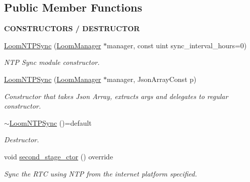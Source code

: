 \subsection*{Public Member Functions}
\begin{Indent}{\bf C\+O\+N\+S\+T\+R\+U\+C\+T\+O\+RS / D\+E\+S\+T\+R\+U\+C\+T\+OR}\par
\begin{DoxyCompactItemize}
\item 
\hyperlink{class_loom_n_t_p_sync_a022444628c2923c9285cdf496c4485e6}{Loom\+N\+T\+P\+Sync} (\hyperlink{class_loom_manager}{Loom\+Manager} $\ast$manager, const uint sync\+\_\+interval\+\_\+hours=0)
\begin{DoxyCompactList}\small\item\em N\+TP Sync module constructor. \end{DoxyCompactList}\item 
\hyperlink{class_loom_n_t_p_sync_a0475c092a7fadd3d0615258560da3225}{Loom\+N\+T\+P\+Sync} (\hyperlink{class_loom_manager}{Loom\+Manager} $\ast$manager, Json\+Array\+Const p)
\begin{DoxyCompactList}\small\item\em Constructor that takes Json Array, extracts args and delegates to regular constructor. \end{DoxyCompactList}\item 
\hyperlink{class_loom_n_t_p_sync_a78ac0f9bcfdf4bb2e283bfcfc19c1983}{$\sim$\+Loom\+N\+T\+P\+Sync} ()=default
\begin{DoxyCompactList}\small\item\em Destructor. \end{DoxyCompactList}\item 
void \hyperlink{class_loom_n_t_p_sync_ad4a9843c49172a83f4c7bcb310f4b177}{second\+\_\+stage\+\_\+ctor} () override
\begin{DoxyCompactList}\small\item\em Sync the R\+TC using N\+TP from the internet platform specified. \end{DoxyCompactList}\end{DoxyCompactItemize}
\end{Indent}
